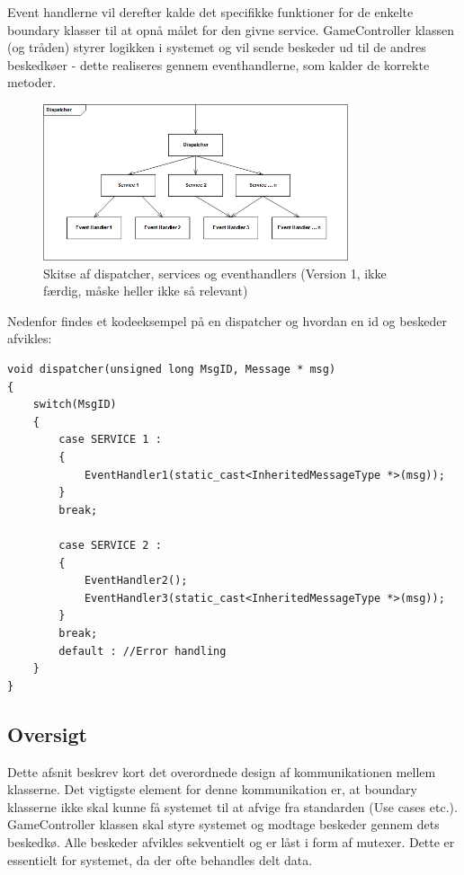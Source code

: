\documentclass[Softwaredesign/Softwaredesign_main.tex]{subfiles}
\begin{document}
Event handlerne vil derefter kalde det specifikke funktioner for de enkelte boundary klasser til at opnå målet for den givne service. GameController klassen (og tråden) styrer logikken i systemet og vil sende beskeder ud til de andres beskedkøer - dette realiseres gennem eventhandlerne, som kalder de korrekte metoder. 
\begin{figure}[H]
    \centering
    \includegraphics[width=0.8\textwidth]{Softwaredesign/RPiApp/graphic_RPi/dispatch.png}
    \caption{Skitse af dispatcher, services og eventhandlers (Version 1, ikke færdig, måske heller ikke så relevant)}
   \label{fig:dispatch}
\end{figure}
Nedenfor findes et kodeeksempel på en dispatcher og hvordan en id og beskeder afvikles: 
\begin{lstlisting}[caption={Dispatcher Design},label={lst:dispatch}]
void dispatcher(unsigned long MsgID, Message * msg)
{
    switch(MsgID) 
    {
        case SERVICE 1 :
        {
            EventHandler1(static_cast<InheritedMessageType *>(msg)); 
        }
        break;
        
        case SERVICE 2 : 
        {
            EventHandler2(); 
            EventHandler3(static_cast<InheritedMessageType *>(msg));
        }
        break;
        default : //Error handling
    }
}
\end{lstlisting}
\subsection{Oversigt}
Dette afsnit beskrev kort det overordnede design af kommunikationen mellem klasserne. Det vigtigste element for denne kommunikation er, at boundary klasserne ikke skal kunne få systemet til at afvige fra standarden (Use cases etc.). GameController klassen skal styre systemet og modtage beskeder gennem dets beskedkø. Alle beskeder afvikles sekventielt og er låst i form af mutexer. Dette er essentielt for systemet, da der ofte behandles delt data. 
\end{document}
